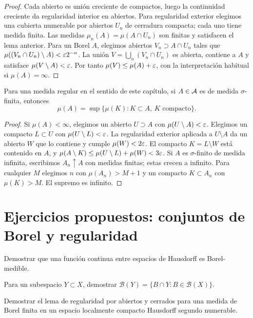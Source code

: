 \begin{proof}
Cada abierto es unión creciente de compactos, luego la continuidad creciente da regularidad interior en abiertos. Para regularidad exterior elegimos una cubierta numerable por abiertos $U_n$ de cerradura compacta; cada uno tiene medida finita. Las medidas $\mu_n(A)=\mu(A\cap U_n)$ son finitas y satisfacen el lema anterior. Para un Borel $A$, elegimos abiertos $V_n\supset A\cap U_n$ tales que $\mu((V_n\cap U_n)\setminus A)<\varepsilon2^{-n}$. La unión $V=\bigcup_n(V_n\cap U_n)$ es abierta, contiene a $A$ y satisface $\mu(V\setminus A)<\varepsilon$. Por tanto $\mu(V)\le\mu(A)+\varepsilon$, con la interpretación habitual si $\mu(A)=\infty$.
\end{proof}
\begin{proposicion}\label{v2:regular-interior-sigma}
Para una medida regular en el sentido de este capítulo, si $A\in\mathcal A$ es de medida $\sigma$-finita, entonces
\[
 \mu(A)=\sup\{\mu(K):K\subset A,\ K\text{ compacto}\}.
\]
\end{proposicion}
\begin{proof}
Si $\mu(A)<\infty$, elegimos un abierto $U\supset A$ con $\mu(U\setminus A)<\varepsilon$. Elegimos un compacto $L\subset U$ con $\mu(U\setminus L)<\varepsilon$. La regularidad exterior aplicada a $U\setminus A$ da un abierto $W$ que lo contiene y cumple $\mu(W)<2\varepsilon$. El compacto $K=L\setminus W$ está contenido en $A$, y $\mu(A\setminus K)\le\mu(U\setminus L)+\mu(W)<3\varepsilon$. Si $A$ es $\sigma$-finito de medida infinita, escribimos $A_n\uparrow A$ con medidas finitas; estas crecen a infinito. Para cualquier $M$ elegimos $n$ con $\mu(A_n)>M+1$ y un compacto $K\subset A_n$ con $\mu(K)>M$. El supremo es infinito.
\end{proof}

\section{Ejercicios propuestos: conjuntos de Borel y regularidad}
\begin{ejercicio}\label{ej:v2-l31-1}
Demostrar que una función continua entre espacios de Hausdorff es Borel-medible.
\end{ejercicio}

\begin{ejercicio}\label{ej:v2-l31-2}
Para un subespacio $Y\subset X$, demostrar $\mathcal B(Y)=\{B\cap Y:B\in\mathcal B(X)\}$.
\end{ejercicio}

\begin{ejercicio}\label{ej:v2-l31-3}
Demostrar el lema de regularidad por abiertos y cerrados para una medida de Borel finita en un espacio localmente compacto Hausdorff segundo numerable.
\end{ejercicio}

